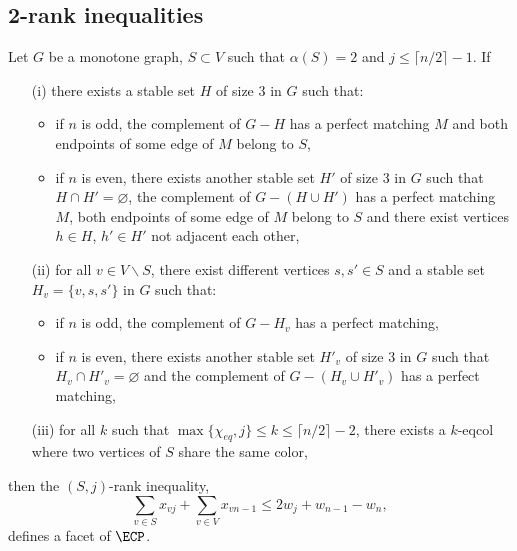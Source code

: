 \subsection{2-rank inequalities}

\begin{tthm} \label{T2RANK1}
Let $G$ be a monotone graph, $S \subset V$ such that $\alpha(S) = 2$ and $j \leq \lceil n/2 \rceil - 1$. If
\begin{enumerate}
\item[(i)] there exists a stable set $H$ of size 3 in $G$ such that:
\begin{itemize}
\item if $n$ is odd, the complement of $G-H$ has a perfect matching $M$ and both endpoints of some edge
of $M$ belong to $S$,
\item if $n$ is even, there exists another stable set $H'$ of size 3 in $G$ such that
$H \cap H' = \varnothing$, the complement of $G - (H \cup H')$ has a perfect matching $M$, both
endpoints of some edge of $M$ belong to $S$ and there exist vertices $h \in H$, $h' \in H'$ not
adjacent each other, 
\end{itemize}
\item[(ii)] for all $v \in V \backslash S$, there exist different vertices $s, s' \in S$
and a stable set $H_v = \{v, s, s'\}$ in $G$ such that:
\begin{itemize}
\item if $n$ is odd, the complement of $G-H_v$ has a perfect matching,
\item if $n$ is even, there exists another stable set $H'_v$ of size 3 in $G$ such that
$H_v \cap H'_v = \varnothing$ and the complement of $G - (H_v \cup H'_v)$ has a perfect matching,
\end{itemize}
\item[(iii)] for all $k$ such that $\max \{\chi_{eq}, j\} \leq k \leq \lceil n/2 \rceil - 2$, there exists a $k$-eqcol
where two vertices of $S$ share the same color,
\end{enumerate}
then the $(S,j)$-rank inequality, \ie
\begin{equation} \label{R2RANK1}
\sum_{v \in S} x_{vj} + \sum_{v \in V} x_{vn-1} \leq 2 w_j + w_{n-1} - w_n,
\end{equation}
defines a facet of $\ECP$.
\end{tthm}
